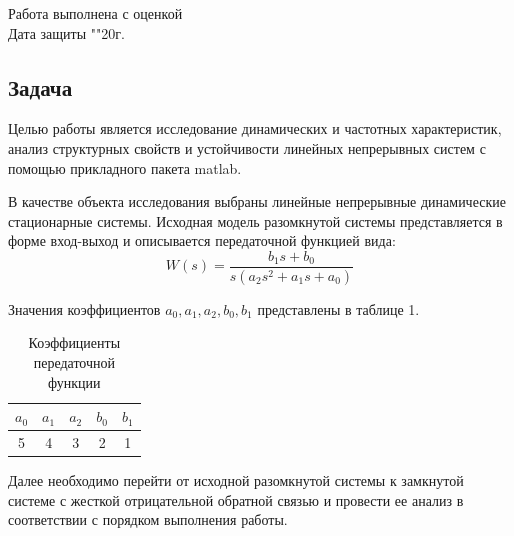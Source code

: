 \documentclass[a4paper, 12pt]{article}
\begin{document}
\begin{titlepage}
	Работа выполнена с оценкой \hspace{1cm} \underline{\hspace{8cm}} \\ 
	\vspace{1cm}
	Дата защиты "\underline{\hspace{0.7cm}}"\hspace{0.2cm}\underline{\hspace{2cm}}\hspace{0.2cm}20\underline{\hspace{0.7cm}}г.
	
\end{titlepage}	

\begin{center}
\section{Задача}
\end{center} \par
Целью работы является исследование динамических и частотных характеристик, анализ структурных свойств и устойчивости линейных непрерывных систем с помощью прикладного пакета matlab. \par
В качестве объекта исследования выбраны линейные непрерывные динамические стационарные системы. Исходная модель разомкнутой системы представляется в форме вход-выход и описывается передаточной функцией вида: 
\begin{equation} 
    W(s) = \frac{b_1s + b_0}{s(a_2s^2 + a_1s + a_0)}
\end{equation} \par
Значения коэффициентов $a_0, a_1, a_2, b_0, b_1$ представлены в таблице 1. \par
\begin{table} [h!]
    \centering
    \begin{threeparttable}
        \caption{Коэффициенты передаточной функции}
        \begin{tabular}{|c|c|c|c|c|}
            \hline
            $a_0$ & $a_1$ & $a_2$ & $b_0$ & $b_1$ \\ \hline
            5 & 4 & 3 & 2 & 1 \\ \hline
        \end{tabular}
    \end{threeparttable}
\end{table}
Далее необходимо перейти от исходной разомкнутой системы к замкнутой системе с жесткой отрицательной обратной связью и провести ее анализ в соответствии с порядком выполнения работы.
\end{document}
